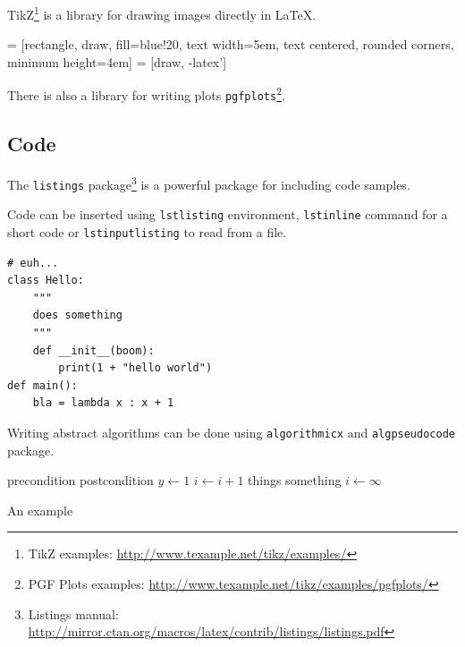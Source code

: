 TikZ\footnote{%
TikZ examples: \url{http://www.texample.net/tikz/examples/}}
is a library for drawing images directly in \LaTeX{}.
\begin{center}
 = [rectangle, draw, fill=blue!20,
	text width=5em, text centered, rounded corners, minimum height=4em]
 = [draw, -latex']
\end{center}

There is also a library for writing plots \texttt{pgfplots}\footnote{%
PGF Plots examples: \url{http://www.texample.net/tikz/examples/pgfplots/}}.
\begin{center}
\end{center}

\subsection{Code}

The \texttt{listings} package\footnote{%
Listings manual:
\url{http://mirror.ctan.org/macros/latex/contrib/listings/listings.pdf}}
is a powerful package for including code samples.

Code can be inserted using \texttt{lstlisting} environment, \texttt{lstinline}
command for a short code or \texttt{lstinputlisting} to read from a file.

\begin{lstlisting}[style=python]
# euh...
class Hello:
	"""
	does something
	"""
	def __init__(boom):
		print(1 + "hello world")
def main():
	bla = lambda x : x + 1
\end{lstlisting}

Writing abstract algorithms can be done using \texttt{algorithmicx} and
\texttt{algpseudocode} package.

\begin{algorithm}
\begin{algorithmic}[1]
\Require precondition
\Ensure postcondition
\State $y \leftarrow 1$
	\State $i \gets i + 1$
\EndFor
{}
	\State things
\EndWhile
\Repeat
	\State something
\Loop
	\State $i \leftarrow \infty$
\EndLoop
\end{algorithmic}
\caption{An example}
\end{algorithm}

